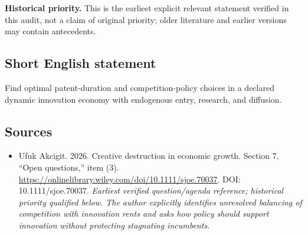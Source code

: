 \documentclass[11pt]{article}
\begin{document}
\par\textbf{Historical priority.} This is the earliest explicit relevant statement verified in this audit, not a claim of original priority; older literature and earlier versions may contain antecedents.

\subsection{Short English statement}
Find optimal patent-duration and competition-policy choices in a declared dynamic innovation economy with endogenous entry, research, and diffusion.

\subsection{Sources}
\begin{itemize}\raggedright
\item[\textnormal{[S1]}]\hypertarget{source:30007549:1}{} Ufuk Akcigit. 2026. Creative destruction in economic growth. Section 7, “Open questions,” item (3).
\url{https://onlinelibrary.wiley.com/doi/10.1111/sjoe.70037}.
DOI: 10.1111/sjoe.70037.
{\small\textit{Earliest verified question/agenda reference; historical priority qualified below. The author explicitly identifies unresolved balancing of competition with innovation rents and asks how policy should support innovation without protecting stagnating incumbents.}}
\end{itemize}
\end{document}
